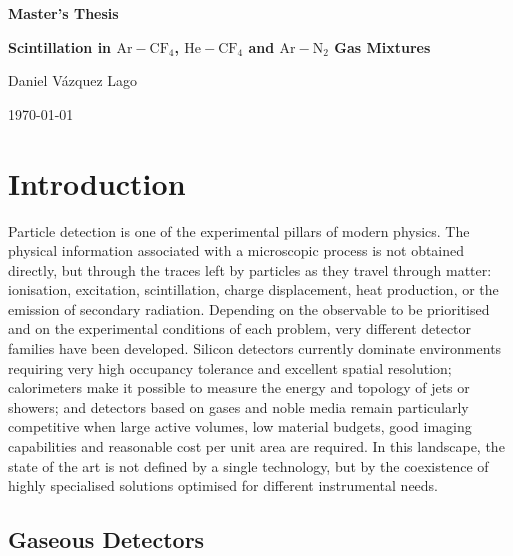 \documentclass[12pt,a4paper]{article}
\newcommand{\N}{\mathrm{N}}
\newcommand{\He}{\mathrm{He}}
\newcommand{\Ar}{\mathrm{Ar}}
\newcommand{\CF}{\mathrm{CF}}
\begin{document}

\thispagestyle{empty}
\begin{titlepage}
    \centering
    \vspace*{0.20\textheight}

    {\Huge\bfseries Master's Thesis\par}
    \vspace{2.2em}

    {\LARGE\bfseries Scintillation in $\Ar-\CF_4$, $\He-\CF_4$ and $\Ar-\N_2$ Gas Mixtures\par}
    \vspace{5em}

    {\Large Daniel Vázquez Lago\par}
    \vspace{2.2em}

    {\Large \today\par}
\end{titlepage}

\pagestyle{empty}
\tableofcontents
\clearpage

\setlength{\parindent}{0pt}
\setlength{\parskip}{0.45em}
\pagestyle{fancy}

\section{Introduction}

Particle detection is one of the experimental pillars of modern physics. The physical information associated with a microscopic process is not obtained directly, but through the traces left by particles as they travel through matter: ionisation, excitation, scintillation, charge displacement, heat production, or the emission of secondary radiation. Depending on the observable to be prioritised and on the experimental conditions of each problem, very different detector families have been developed. Silicon detectors currently dominate environments requiring very high occupancy tolerance and excellent spatial resolution; calorimeters make it possible to measure the energy and topology of jets or showers; and detectors based on gases and noble media remain particularly competitive when large active volumes, low material budgets, good imaging capabilities and reasonable cost per unit area are required. In this landscape, the state of the art is not defined by a single technology, but by the coexistence of highly specialised solutions optimised for different instrumental needs.

\subsection{Gaseous Detectors}
\end{document}
